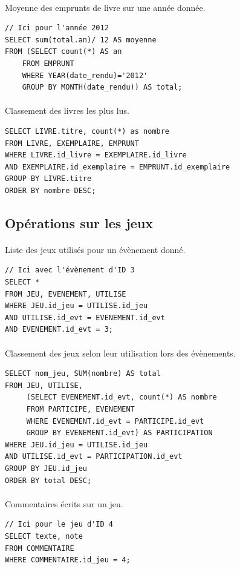 \documentclass[a4paper, 11pt]{article}
\begin{document}
\paragraph{}
Moyenne des emprunts de livre sur une année donnée.
\begin{verbatim}
// Ici pour l'année 2012
SELECT sum(total.an)/ 12 AS moyenne 
FROM (SELECT count(*) AS an 
    FROM EMPRUNT 
    WHERE YEAR(date_rendu)='2012' 
    GROUP BY MONTH(date_rendu)) AS total;
\end{verbatim}
\paragraph{}
Classement des livres les plus lus.
\begin{verbatim}
SELECT LIVRE.titre, count(*) as nombre 
FROM LIVRE, EXEMPLAIRE, EMPRUNT 
WHERE LIVRE.id_livre = EXEMPLAIRE.id_livre 
AND EXEMPLAIRE.id_exemplaire = EMPRUNT.id_exemplaire 
GROUP BY LIVRE.titre 
ORDER BY nombre DESC;
\end{verbatim}
\subsection{Opérations sur les jeux}
\paragraph{}
Liste des jeux utilisés pour un évènement donné.
\begin{verbatim}
// Ici avec l'évènement d'ID 3
SELECT *
FROM JEU, EVENEMENT, UTILISE
WHERE JEU.id_jeu = UTILISE.id_jeu
AND UTILISE.id_evt = EVENEMENT.id_evt
AND EVENEMENT.id_evt = 3;
\end{verbatim}
\paragraph{}
Classement des jeux selon leur utilisation lors des évènements.
\begin{verbatim}
SELECT nom_jeu, SUM(nombre) AS total
FROM JEU, UTILISE, 
     (SELECT EVENEMENT.id_evt, count(*) AS nombre 
     FROM PARTICIPE, EVENEMENT 
     WHERE EVENEMENT.id_evt = PARTICIPE.id_evt 
     GROUP BY EVENEMENT.id_evt) AS PARTICIPATION
WHERE JEU.id_jeu = UTILISE.id_jeu
AND UTILISE.id_evt = PARTICIPATION.id_evt
GROUP BY JEU.id_jeu
ORDER BY total DESC;
\end{verbatim}
\paragraph{}
Commentaires écrits sur un jeu.
\begin{verbatim}
// Ici pour le jeu d'ID 4
SELECT texte, note 
FROM COMMENTAIRE
WHERE COMMENTAIRE.id_jeu = 4;
\end{verbatim}
\end{document}
